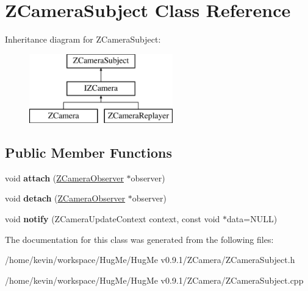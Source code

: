 \hypertarget{classZCameraSubject}{
\section{ZCameraSubject Class Reference}
\label{classZCameraSubject}
}
Inheritance diagram for ZCameraSubject:\begin{figure}[H]
\begin{center}
\leavevmode
\includegraphics[height=3cm]{classZCameraSubject}
\end{center}
\end{figure}
\subsection*{Public Member Functions}
\begin{DoxyCompactItemize}
\item 
\hypertarget{classZCameraSubject_a03a7bde4d7455c415bed12941121f304}{
void {\bfseries attach} (\hyperlink{classZCameraObserver}{ZCameraObserver} $\ast$observer)}
\label{classZCameraSubject_a03a7bde4d7455c415bed12941121f304}

\item 
\hypertarget{classZCameraSubject_acdcf65ddc2d3ea93d0b2012b095b0ed1}{
void {\bfseries detach} (\hyperlink{classZCameraObserver}{ZCameraObserver} $\ast$observer)}
\label{classZCameraSubject_acdcf65ddc2d3ea93d0b2012b095b0ed1}

\item 
\hypertarget{classZCameraSubject_a6c47d74ec2b13313052462250177f9e8}{
void {\bfseries notify} (ZCameraUpdateContext context, const void $\ast$data=NULL)}
\label{classZCameraSubject_a6c47d74ec2b13313052462250177f9e8}

\end{DoxyCompactItemize}


The documentation for this class was generated from the following files:\begin{DoxyCompactItemize}
\item 
/home/kevin/workspace/HugMe/HugMe v0.9.1/ZCamera/ZCameraSubject.h\item 
/home/kevin/workspace/HugMe/HugMe v0.9.1/ZCamera/ZCameraSubject.cpp\end{DoxyCompactItemize}
